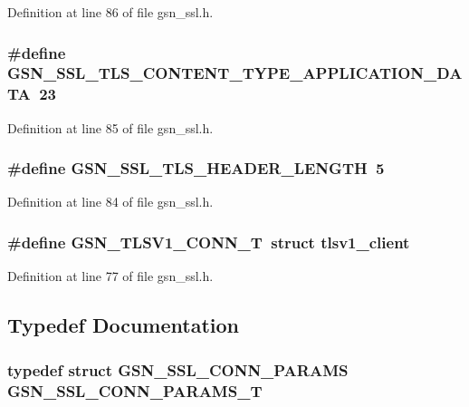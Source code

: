 Definition at line 86 of file gsn\_\-ssl.h.

\hypertarget{a00590_a3bac6333c6a4a404e7c259c37660d421}{
\subsubsection[{GSN\_\-SSL\_\-TLS\_\-CONTENT\_\-TYPE\_\-APPLICATION\_\-DATA}]{\setlength{\rightskip}{0pt plus 5cm}\#define GSN\_\-SSL\_\-TLS\_\-CONTENT\_\-TYPE\_\-APPLICATION\_\-DATA~23}}
\label{a00590_a3bac6333c6a4a404e7c259c37660d421}


Definition at line 85 of file gsn\_\-ssl.h.

\hypertarget{a00590_af010106869d3f50993c95d5194622f13}{
\subsubsection[{GSN\_\-SSL\_\-TLS\_\-HEADER\_\-LENGTH}]{\setlength{\rightskip}{0pt plus 5cm}\#define GSN\_\-SSL\_\-TLS\_\-HEADER\_\-LENGTH~5}}
\label{a00590_af010106869d3f50993c95d5194622f13}


Definition at line 84 of file gsn\_\-ssl.h.

\hypertarget{a00590_a015c2dade92f5f5d0f34f3542137f878}{
\subsubsection[{GSN\_\-TLSV1\_\-CONN\_\-T}]{\setlength{\rightskip}{0pt plus 5cm}\#define GSN\_\-TLSV1\_\-CONN\_\-T~struct tlsv1\_\-client}}
\label{a00590_a015c2dade92f5f5d0f34f3542137f878}


Definition at line 77 of file gsn\_\-ssl.h.



\subsection{Typedef Documentation}
\hypertarget{a00590_ad6dda2b8b9bdde45cf9ddc89943cd611}{
\subsubsection[{GSN\_\-SSL\_\-CONN\_\-PARAMS\_\-T}]{\setlength{\rightskip}{0pt plus 5cm}typedef struct {\bf GSN\_\-SSL\_\-CONN\_\-PARAMS} {\bf GSN\_\-SSL\_\-CONN\_\-PARAMS\_\-T}}}
\label{a00590_ad6dda2b8b9bdde45cf9ddc89943cd611}


